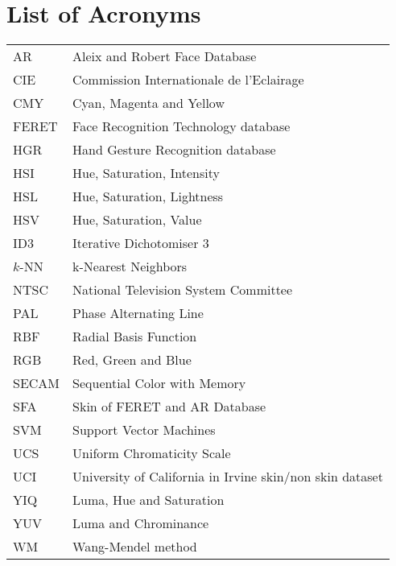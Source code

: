 \documentclass[11pt,twoside,a4paper]{book}
\theoremstyle{plain}
\theoremstyle{definition}
\begin{document}
\chapter{List of Acronyms}
\begin{tabular}{ll}
    AR          & Aleix and Robert Face Database\\
    CIE         & Commission Internationale de l'Eclairage\\
    CMY         & Cyan, Magenta and Yellow\\
    FERET       & Face Recognition Technology database\\
    HGR         & Hand Gesture Recognition database\\
    HSI         & Hue, Saturation, Intensity\\
    HSL         & Hue, Saturation, Lightness\\
    HSV         & Hue, Saturation, Value\\
    ID3         & Iterative Dichotomiser 3\\
    $k$-NN      & k-Nearest Neighbors\\
    NTSC        & National Television System Committee\\
    PAL         & Phase Alternating Line\\
    RBF         & Radial Basis Function\\
    RGB         & Red, Green and Blue\\
    SECAM       & Sequential Color with Memory\\
    SFA         & Skin of FERET and AR Database\\
    SVM         & Support Vector Machines\\
    UCS         & Uniform Chromaticity Scale\\
    UCI         & University of California in Irvine skin/non skin dataset\\
    YIQ         & Luma, Hue and Saturation\\
    YUV         & Luma and Chrominance\\
    WM          & Wang-Mendel method\\
\end{tabular}

\end{document}
